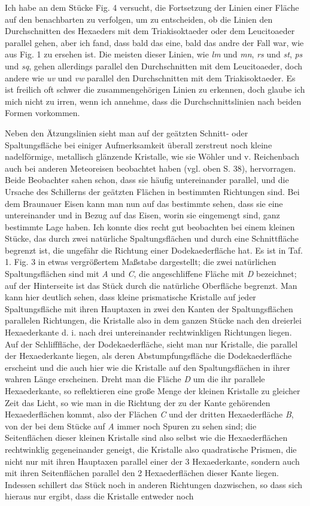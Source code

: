 \documentclass[a4paper, 11pt, oneside]{article}
\begin{document}
Ich habe an dem Stücke Fig. 4 versucht, die Fortsetzung der Linien einer Fläche auf den benachbarten zu verfolgen, um zu entscheiden, ob die Linien den Durchschnitten des Hexaeders mit dem Triakisoktaeder oder dem Leucitoaeder parallel gehen, aber ich fand, dass bald das eine, bald das andre der Fall war, wie aus Fig. 1 zu ersehen ist. Die meisten dieser Linien, wie \emph{lm} und \emph{mn}, \emph{rs} und \emph{st}, \emph{ps} und \emph{sq}, gehen allerdings parallel den Durchschnitten mit dem Leucitoaeder, doch andere wie \emph{uv} und \emph{vw} parallel den Durchschnitten mit dem Triakisoktaeder. Es ist freilich oft schwer die zusammengehörigen Linien zu erkennen, doch glaube ich mich nicht zu irren, wenn ich annehme, dass die Durchschnittslinien nach beiden Formen vorkommen.

Neben den Ätzungslinien sieht man auf der geätzten Schnitt- oder Spaltungsfläche bei einiger Aufmerksamkeit überall zerstreut noch kleine nadelförmige, metallisch glänzende Kristalle, wie sie Wöhler und v. Reichenbach auch bei anderen Meteoreisen beobachtet haben (vgl. oben S. 38), hervorragen. Beide Beobachter sahen schon, dass sie häufig untereinander parallel, und die Ursache des Schillerns der geätzten Flächen in bestimmten Richtungen sind. Bei dem Braunauer Eisen kann man nun auf das bestimmte sehen, dass sie eine untereinander und in Bezug auf das Eisen, worin sie eingemengt sind, ganz bestimmte Lage haben. Ich konnte dies recht gut beobachten bei einem kleinen Stücke, das durch zwei natürliche Spaltungsflächen und durch eine Schnittfläche begrenzt ist, die ungefähr die Richtung einer Dodekaederfläche hat. Es ist in Taf. 1. Fig. 3 in etwas vergrößertem Maßstabe dargestellt; die zwei natürlichen Spaltungsflächen sind mit \emph{A} und \emph{C}, die angeschliffene Fläche mit \emph{D} bezeichnet; auf der Hinterseite ist das Stück durch die natürliche Oberfläche begrenzt. Man kann hier deutlich sehen, dass kleine prismatische Kristalle auf jeder Spaltungsfläche mit ihren Hauptaxen in zwei den Kanten der Spaltungsflächen parallelen Richtungen, die Kristalle also in dem ganzen Stücke nach den dreierlei Hexaederkante d. i. nach drei untereinander rechtwinkligen Richtungen liegen. Auf der Schlifffläche, der Dodekaederfläche, sieht man nur Kristalle, die parallel der Hexaederkante liegen, als deren Abstumpfungsfläche die Dodekaederfläche erscheint und die auch hier wie die Kristalle auf den Spaltungsflächen in ihrer wahren Länge erscheinen. Dreht man die Fläche \emph{D} um die ihr parallele Hexaederkante, so reflektieren eine große Menge der kleinen Kristalle zu gleicher Zeit das Licht, so wie man in die Richtung der zu der Kante gehörenden Hexaederflächen kommt, also der Flächen \emph{C} und der dritten Hexaederfläche \emph{B}, von der bei dem Stücke auf \emph{A} immer noch Spuren zu sehen sind; die Seitenflächen dieser kleinen Kristalle sind also selbst wie die Hexaederflächen rechtwinklig gegeneinander geneigt, die Kristalle also quadratische Prismen, die nicht nur mit ihren Hauptaxen parallel einer der 3 Hexaederkante, sondern auch mit ihren Seitenflächen parallel den 2 Hexaederflächen dieser Kante liegen. Indessen schillert das Stück noch in anderen Richtungen dazwischen, so dass sich hieraus nur ergibt, dass die Kristalle entweder noch 
\end{document}

